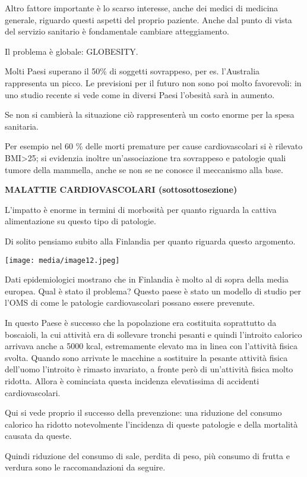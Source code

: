 \documentclass[]{article}
\begin{document}
Altro fattore importante è lo scarso interesse, anche dei medici di
medicina generale, riguardo questi aspetti del proprio paziente. Anche
dal punto di vista del servizio sanitario è fondamentale cambiare
atteggiamento.

Il problema è globale: GLOBESITY.

Molti Paesi superano il 50\% di soggetti sovrappeso, per es. l'Australia
rappresenta un picco. Le previsioni per il futuro non sono poi molto
favorevoli: in uno studio recente si vede come in diversi Paesi
l'obesità sarà in aumento.

Se non si cambierà la situazione ciò rappresenterà un costo enorme per
la spesa sanitaria.

Per esempio nel 60 \% delle morti premature per cause cardiovascolari si
è rilevato BMI\textgreater{}25; si evidenzia inoltre un'associazione tra
sovrappeso e patologie quali tumore della mammella, anche se non se ne
conosce il meccanismo alla base.

\textbf{MALATTIE CARDIOVASCOLARI (sottosottosezione)}

L'impatto è enorme in termini di morbosità per quanto riguarda la
cattiva alimentazione su questo tipo di patologie.

Di solito pensiamo subito alla Finlandia per quanto riguarda questo
argomento.

\texttt{[image: media/image12.jpeg]}

Dati epidemiologici mostrano che in Finlandia è molto al di sopra della
media europea. Qual è stato il problema? Questo paese è stato un modello
di studio per l'OMS di come le patologie cardiovascolari possano essere
prevenute.

In questo Paese è successo che la popolazione era costituita soprattutto
da boscaioli, la cui attività era di sollevare tronchi pesanti e quindi
l'introito calorico arrivava anche a 5000 kcal, estremamente elevato ma
in linea con l'attività fisica svolta. Quando sono arrivate le macchine
a sostituire la pesante attività fisica dell'uomo l'introito è rimasto
invariato, a fronte però di un'attività fisica molto ridotta. Allora è
cominciata questa incidenza elevatissima di accidenti cardiovascolari.

Qui si vede proprio il successo della prevenzione: una riduzione del
consumo calorico ha ridotto notevolmente l'incidenza di queste patologie
e della mortalità causata da queste.

Quindi riduzione del consumo di sale, perdita di peso, più consumo di
frutta e verdura sono le raccomandazioni da seguire.
\end{document}
